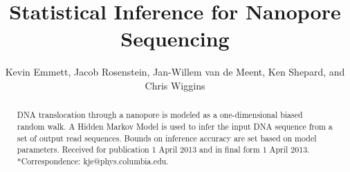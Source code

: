 \documentclass{biophys_letter}
\begin{document}
\setcounter{page}{1} %
\title{Statistical Inference for Nanopore Sequencing}

\author{Kevin Emmett,{\authdagger} Jacob Rosenstein, Jan-Willem van de Meent, Ken Shepard, and Chris Wiggins}

\address{{\addrdagger}Department of Physics and Department of Applied Physics and Applied Math, Columbia University, New York, New York; and Department of Mechanical Engineering, Brown University, Providence, Rhode Island}

\maketitle

\pagestyle{headings}



\begin{abstract}
{DNA translocation through a nanopore is modeled as a one-dimensional biased random walk. A Hidden Markov Model is used to infer the input DNA sequence from a set of output read sequences. Bounds on inference accuracy are set based on model parameters.}
{Received for publication 1 April 2013 and in final form 1 April 2013.}
{*Correspondence: kje@phys.columbia.edu.}
\end{abstract}

\vspace*{2.7pt}
\end{document}
